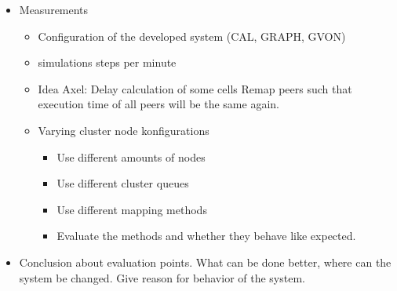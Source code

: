 \begin{itemize}
\item Measurements
  \begin{itemize}
  \item Configuration of the developed system (CAL, GRAPH, GVON)
  \item simulations steps per minute
  \item Idea Axel: Delay calculation of some cells
    Remap peers such that execution time of all peers
    will be the same again.
  \item Varying cluster node konfigurations
    \begin{itemize}
      \item Use different amounts of nodes
      \item Use different cluster queues
      \item Use different mapping methods
      \item Evaluate the methods and whether they
        behave like expected.
    \end{itemize}
  \end{itemize}

\item Conclusion about evaluation points. What can
  be done better, where can the system be changed.
  Give reason for behavior of the system.

\end{itemize}

\cleardoublepage

